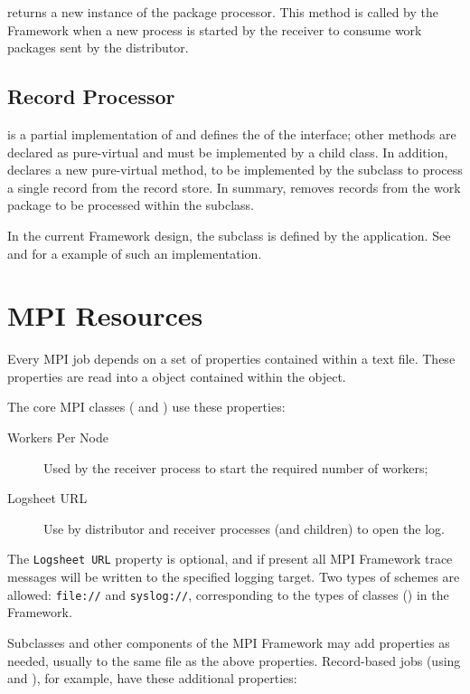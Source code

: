  returns a new instance of the package processor.
This method is called by the Framework when a new process is started by the
receiver to consume work packages sent by the distributor.

\subsection{Record Processor}
\label{sec-recordprocessor}
 is a partial implementation of 
 and defines the 
of the  interface; other methods are declared as
pure-virtual and must be implemented by a child class. In addition,
 declares a new pure-virtual method,
 to be implemented by the subclass to process a single
record from the record store. In summary,  removes
records from the work package to be processed within the subclass.

In the current Framework design, the subclass is defined by the application.
See~ and  for a example of
such an implementation.

\section{MPI Resources}
\label{sec-mpiresources}
Every MPI job depends on a set of properties contained within a text file.
These properties are read into a  object contained within
the  object.

The core MPI classes ( and ) use these
properties:
\begin{description}
\item[Workers Per Node] Used by the receiver process to start the
required number of workers;
\item[Logsheet URL] Use by distributor and receiver processes
(and children) to open the log.
\end{description}

The \verb=Logsheet URL= property is optional, and if present all MPI Framework
trace messages will be written to the specified logging target. Two types of
\URL schemes are allowed: \verb=file://= and \verb=syslog://=, corresponding
to the types of  classes () in the
Framework.

Subclasses and other components of the MPI Framework may add properties as
needed, usually to the same file as the above properties. Record-based jobs
(using  and ), for example,
have these additional properties:

